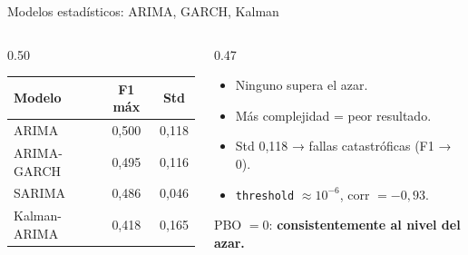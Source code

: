 \documentclass[aspectratio=169, spanish, 12pt]{beamer}
\begin{document}
\begin{frame}{Modelos estadísticos: ARIMA, GARCH, Kalman}
  \begin{columns}[T]
    \begin{column}{0.50\textwidth}
      \begin{tcolorbox}[familybox=colstat]
        \begin{tabular}{lcc}
          \toprule
          \textbf{Modelo} & \textbf{F1 máx} & \textbf{Std} \\
          \midrule
          ARIMA           & 0,500 & 0,118 \\
          ARIMA-GARCH     & 0,495 & 0,116 \\
          SARIMA          & 0,486 & 0,046 \\
          Kalman-ARIMA    & 0,418 & 0,165 \\
          \bottomrule
        \end{tabular}
      \end{tcolorbox}
    \end{column}
    \begin{column}{0.47\textwidth}
      \begin{itemize}
        \item[\faTimes] Ninguno supera el azar.
        \item[\faArrowDown] Más complejidad = peor resultado.
        \item[\faExclamationTriangle] Std 0,118 → fallas catastróficas (F1 → 0).
        \item[\faKey] \texttt{threshold} $\approx 10^{-6}$, corr $= -0{,}93$.
      \end{itemize}
      \vspace{0.3em}
      \begin{tcolorbox}[familybox=accent, top=2pt, bottom=2pt]
        \normalsize PBO $= 0$: \textbf{consistentemente al nivel del azar.}
      \end{tcolorbox}
    \end{column}
  \end{columns}
\end{frame}
\end{document}
